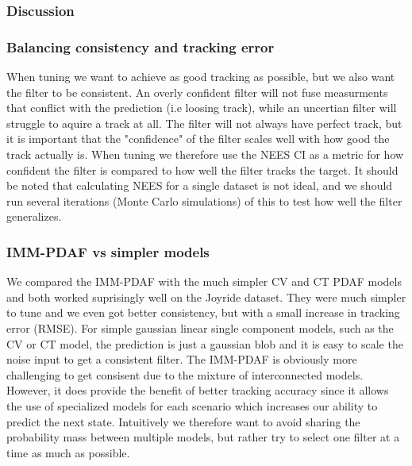 \subsubsection{Discussion}
\subsubsection{Balancing consistency and tracking error}
When tuning we want to achieve as good tracking as possible, but we also want the filter to be consistent. An overly confident filter will not fuse measurments that conflict with the prediction (i.e loosing track), while an uncertian filter will struggle to aquire a track at all. The filter will not always have perfect track, but it is important that the "confidence" of the filter scales well with how good the track actually is.
When tuning we therefore use the NEES CI as a metric for how confident the filter is compared to how well the filter tracks the target. It should be noted that calculating NEES for a single dataset is not ideal, and we should run several iterations (Monte Carlo simulations) of this to test how well the filter generalizes.

\subsubsection{IMM-PDAF vs simpler models} \label{whyimmpdaf}
We compared the IMM-PDAF with the much simpler CV and CT PDAF models and both worked suprisingly well on the Joyride dataset. They were much simpler to tune and we even got better consistency, but with a small increase in tracking error (RMSE). For simple gaussian linear single component models, such as the CV or CT model, the prediction is just a gaussian blob and it is easy to scale the noise input to get a consistent filter. The IMM-PDAF is obviously more challenging to get consisent due to the mixture of interconnected models. However, it does provide the benefit of better tracking accuracy since it allows the use of specialized models for each scenario which increases our ability to predict the next state. Intuitively we therefore want to avoid sharing the probability mass between multiple models, but rather try to select one filter at a time as much as possible.
